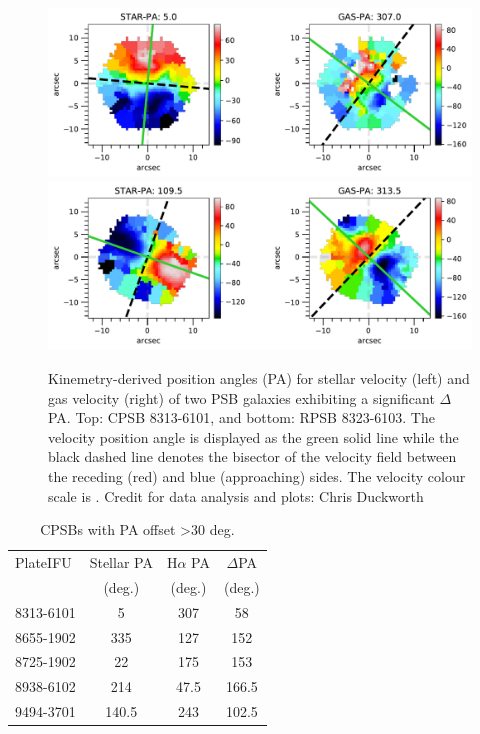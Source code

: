\begin{figure}
    \centering
    \includegraphics[width=\columnwidth]{images/PAplots/PAplotsCPSB/8313-6101-PA.pdf}
    \includegraphics[width=\columnwidth]{images/PAplots/PAplotsRPSB/8323-6103-PA.pdf}
    \caption{Kinemetry-derived position angles (PA) for stellar velocity (left) and gas velocity (right) of two PSB galaxies exhibiting a significant $\Delta$PA. Top: CPSB 8313-6101, and bottom: RPSB 8323-6103. The velocity position angle is displayed as the green solid line while the black dashed line denotes the bisector of the velocity field between the receding (red) and blue (approaching) sides. The velocity colour scale is \kms. Credit for data analysis and plots: Chris Duckworth}
    \label{fig:CPSB-8313-6101-PA}
\end{figure}

\begin{table}
\caption{CPSBs with PA offset \textgreater 30 deg.}
\label{tab:offsetCPSBs}
\begin{tabular}{lccc}
\hline
PlateIFU  & Stellar PA & H$\alpha$ PA & $\Delta$PA \\
  & (deg.) & (deg.) & (deg.) \\
\hline
8313-6101 & 5 & 307 & 58 \\
8655-1902 & 335 & 127 & 152 \\
8725-1902 & 22 & 175 & 153 \\
8938-6102 & 214 & 47.5 & 166.5 \\
9494-3701 & 140.5 & 243 & 102.5 \\
\hline
\end{tabular}
\end{table}

